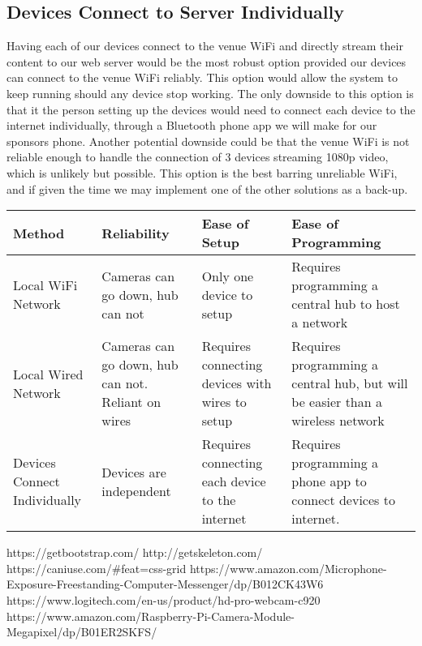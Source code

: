 \documentclass[onecolumn, draftclsnofoot,10pt, compsoc]{IEEEtran}
\begin{document}
    \subsection{Devices Connect to Server Individually}
    Having each of our devices connect to the venue WiFi and directly stream their content to our web server would be the most robust option provided our devices can connect to the venue WiFi reliably. This option would allow the system to keep running should any device stop working. The only downside to this option is that it the person setting up the devices would need to connect each device to the internet individually, through a Bluetooth phone app we will make for our sponsors phone. Another potential downside could be that the venue WiFi is not reliable enough to handle the connection of 3 devices streaming 1080p video, which is unlikely but possible. This option is the best barring unreliable WiFi, and if given the time we may implement one of the other solutions as a back-up.
    \newline
    \newline
\begin{tabular}{|l|p{4cm}|p{4cm}|p{4cm}|}
         \hline
         Method & Reliability & Ease of Setup & Ease of Programming \\ \hline
         
         Local WiFi Network & Cameras can go down, hub can not & Only one device to setup & Requires programming a central hub to host a network\\ \hline
         
         Local Wired Network & Cameras can go down, hub can not. Reliant on wires & Requires connecting devices with wires to setup & Requires programming a central hub, but will be easier than a wireless network \\ \hline
         
         Devices Connect Individually & Devices are independent & Requires connecting each device to the internet & Requires programming a phone app to connect devices to internet. \\ \hline
    \end{tabular}
    \newline
\begin{thebibliography}{1}

https://getbootstrap.com/
http://getskeleton.com/
https://caniuse.com/#feat=css-grid
https://www.amazon.com/Microphone-Exposure-Freestanding-Computer-Messenger/dp/B012CK43W6
 https://www.logitech.com/en-us/product/hd-pro-webcam-c920
https://www.amazon.com/Raspberry-Pi-Camera-Module-Megapixel/dp/B01ER2SKFS/

\end{thebibliography}
\end{document}
